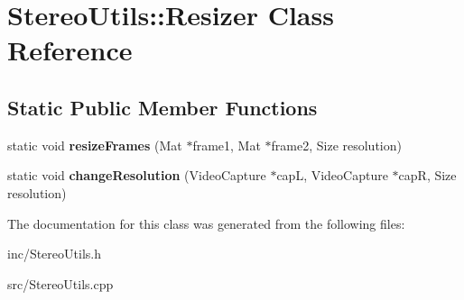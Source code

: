 \hypertarget{class_stereo_utils_1_1_resizer}{}\section{Stereo\+Utils\+:\+:Resizer Class Reference}
\label{class_stereo_utils_1_1_resizer}
\subsection*{Static Public Member Functions}
\begin{DoxyCompactItemize}
\item 
static void {\bfseries resize\+Frames} (Mat $\ast$frame1, Mat $\ast$frame2, Size resolution)\hypertarget{class_stereo_utils_1_1_resizer_a81ffa2df134e07b9f43da76a9002de24}{}\label{class_stereo_utils_1_1_resizer_a81ffa2df134e07b9f43da76a9002de24}

\item 
static void {\bfseries change\+Resolution} (Video\+Capture $\ast$capL, Video\+Capture $\ast$capR, Size resolution)\hypertarget{class_stereo_utils_1_1_resizer_a49c1a46a8ac96f3891b4568e6fb2c501}{}\label{class_stereo_utils_1_1_resizer_a49c1a46a8ac96f3891b4568e6fb2c501}

\end{DoxyCompactItemize}


The documentation for this class was generated from the following files\+:\begin{DoxyCompactItemize}
\item 
inc/Stereo\+Utils.\+h\item 
src/Stereo\+Utils.\+cpp\end{DoxyCompactItemize}
